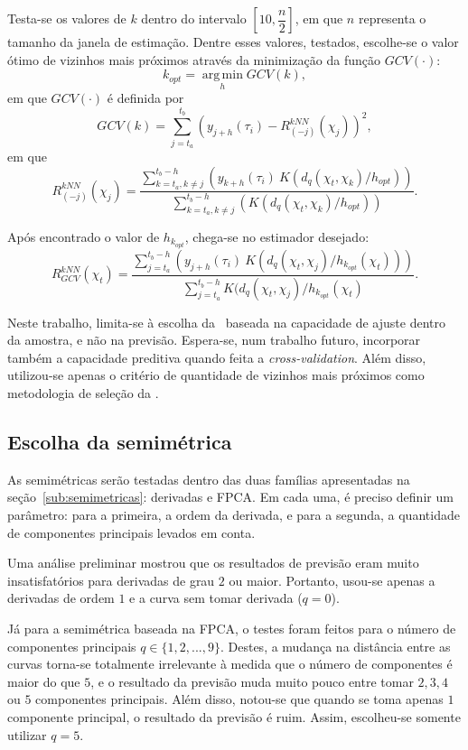 \documentclass[
	12pt,				%
	openright,			%
	oneside,			%
	a4paper,			%
	english,			%
	brazil				%
	]{dissertacao-ufrgs-abntex2}
\begin{document}
\begin{description}
Testa-se os valores de $k$ dentro do intervalo $[10,\dfrac{n}{2}]$, em que $n$ representa o tamanho da janela de estimação. Dentre esses valores, testados, escolhe-se o valor ótimo de vizinhos mais próximos através da minimização da função $GCV(\cdot)$:
\[k_{opt} = \operatorname*{arg\,min}_h GCV(k),\]
em que $GCV(\cdot)$ é definida por
\[
GCV(k) = \sum \limits_{j=t_a}^{t_b} \left(  y_{j+h}(\tau_i) - R_{(-j)}^{kNN}(\chi_j)  \right)^2, 
\]
em que
\[
R_{(-j)}^{kNN}(\chi_j) = 
\frac
	{\sum \limits_{k=t_a, k \neq j}^{t_b-h} \left( y_{k+h}(\tau_i)~ K(d_{q}(\chi_t,\chi_k)/h_{opt}) \right) }
	{\sum \limits_{k=t_a, k \neq j}^{t_b-h} \left( K(d_{q}(\chi_t,\chi_k)/h_{opt}) \right)  }.
\]


Após encontrado o valor de $h_{k_{opt}}$, chega-se no estimador desejado:
\[
R_{GCV}^{kNN}(\chi_t)=
\frac
	{\sum \limits_{j=t_a}^{t_b-h} \left( y_{j+h}(\tau_i)~ K(d_{q}(\chi_t,\chi_j)/h_{k_{opt}}(\chi_t)) \right) }
	{\sum \limits_{j=t_a}^{t_b-h} K(d_{q}(\chi_t,\chi_j)/h_{k_{opt}}(\chi_t) }.
\]


\end{description}

Neste trabalho, limita-se à escolha da \bw~baseada na capacidade de ajuste dentro da amostra, e não na previsão. Espera-se, num trabalho futuro, incorporar também a capacidade preditiva quando feita a \emph{cross-validation}. Além disso, utilizou-se apenas o critério de quantidade de vizinhos mais próximos como metodologia de seleção da \bw.

\subsection{Escolha da semimétrica}

As semimétricas serão testadas dentro das duas famílias apresentadas na seção~\ref{sub:semimetricas}: derivadas e FPCA. Em cada uma, é preciso definir um parâmetro: para a primeira, a ordem da derivada, e para a segunda, a quantidade de componentes principais levados em conta.

Uma análise preliminar mostrou que os resultados de previsão eram muito insatisfatórios para derivadas de grau $2$ ou maior. Portanto, usou-se apenas a derivadas de ordem $1$ e a curva sem tomar derivada ($q=0$).

Já para a semimétrica baseada na FPCA, o testes foram feitos para o número de componentes principais $q \in \{1, 2, ..., 9\}$. Destes, a mudança na distância entre as curvas torna-se totalmente irrelevante à medida que o número de componentes é maior do que $5$, e o resultado da previsão muda muito pouco entre tomar $2,3,4$ ou $5$ componentes principais. Além disso, notou-se que quando se toma apenas $1$ componente principal, o resultado da previsão é ruim. Assim, escolheu-se somente utilizar $q=5$.
\end{document}
